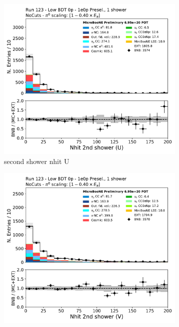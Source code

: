 \begin{figure}[H]
    \centering
    \begin{subfigure}{0.3\textwidth}
    \includegraphics[width=1.0\textwidth]{1e0p/Low_BDT_Sideband/secondshower_U_nhit.pdf}
    \caption{second shower nhit U}
    \end{subfigure}
    \begin{subfigure}{0.3\textwidth}
    \includegraphics[width=1.0\textwidth]{1e0p/Low_BDT_Sideband/secondshower_V_nhit.pdf}

\end{subfigure}
\end{figure}
